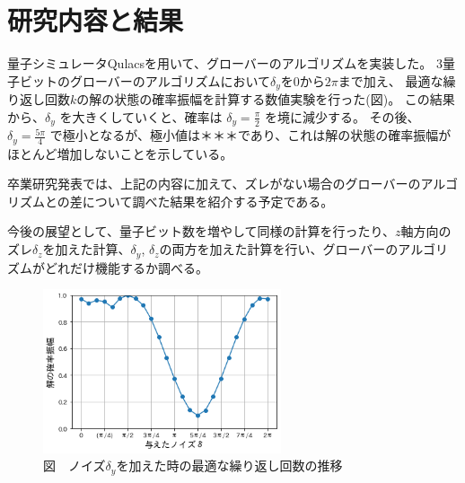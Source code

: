 \documentclass[platex,dvipdfmx, twocolumn]{jsarticle}			%
\begin{document}
\section{研究内容と結果}
量子シミュレータQulacsを用いて、グローバーのアルゴリズムを実装した。
3量子ビットのグローバーのアルゴリズムにおいて$\delta_y$を$0$から$2\pi$まで加え、
最適な繰り返し回数$k$の解の状態の確率振幅を計算する数値実験を行った(図)。
この結果から、$\delta_y$ を大きくしていくと、確率は $\delta_y = \frac{\pi}{2}$ を境に減少する。
その後、 $\delta_y = \frac{5\pi}{4}$ で極小となるが、極小値は＊＊＊であり、これは解の状態の確率振幅がほとんど増加しないことを示している。

卒業研究発表では、上記の内容に加えて、ズレがない場合のグローバーのアルゴリズムとの差について調べた結果を紹介する予定である。

今後の展望として、量子ビット数を増やして同様の計算を行ったり、$z$軸方向のズレ$\delta_z$を加えた計算、$\delta_y$, $\delta_z$の両方を加えた計算を行い、グローバーのアルゴリズムがどれだけ機能するか調べる。

\begin{figure}
\centering
\includegraphics[width=70mm]{figures/sample.png}
\caption*{図　ノイズ$\delta_y$を加えた時の最適な繰り返し回数の推移}
\label{fig:P(k)}
\end{figure}



\end{document}
